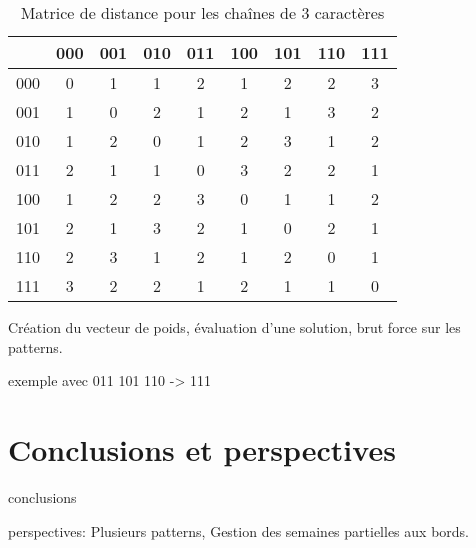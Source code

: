 \documentclass{roadef}
\begin{document}
\begin{table}[!ht]
    \begin{center}
        \begin{tabular}{|c|cccccccc|}
            \hline
            & 000 & 001 & 010 & 011 & 100 & 101 & 110 & 111\\
            \hline
            000 & 0 & 1 &   1 &   2 &   1 &   2 &   2 &   3\\
            001 & 1 & 0 &   2 &   1 &   2 &   1 &   3 &   2\\
            010 & 1 & 2 &   0 &   1 &   2 &   3 &   1 &   2\\
            011 & 2 & 1 &   1 &   0 &   3 &   2 &   2 &   1\\
            100 & 1 & 2 &   2 &   3 &   0 &   1 &   1 &   2\\
            101 & 2 & 1 &   3 &   2 &   1 &   0 &   2 &   1\\
            110 & 2 & 3 &   1 &   2 &   1 &   2 &   0 &   1\\
            111 & 3 & 2 &   2 &   1 &   2 &   1 &   1 &   0\\
            \hline
        \end{tabular}
        \caption{Matrice de distance pour les chaînes de 3 caractères}
    \label{matrice-distances}
    \end{center}
\end{table}

Création du vecteur de poids, évaluation d'une solution, brut force sur
les patterns.

exemple avec 011 101 110 -> 111

\section{Conclusions et perspectives}

conclusions

perspectives: Plusieurs patterns, Gestion des semaines partielles aux
bords.



\end{document}
